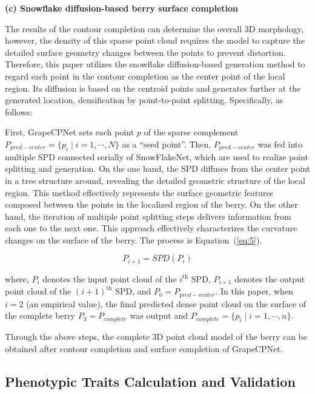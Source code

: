 \documentclass[12pt]{article}
\begin{document}
{\raggedright\textbf{(c) Snowflake diffusion-based berry surface completion}}

The results of the contour completion can determine the overall 3D morphology, however, the density of this sparse point cloud requires the model to capture the detailed surface geometry changes between the points to prevent distortion. 
Therefore, this paper utilizes the snowflake diffusion-based generation method to regard each point in the contour completion as the center point of the local region. 
Its diffusion is based on the centroid points and generates further at the generated location, densification by point-to-point splitting. 
Specifically, as follows:

First, GrapeCPNet sets each point $p$ of the sparse complement $P_{pred-center}=\{p_i \mid i=1,\cdots,N\}$ as a ``seed point''. 
Then, $P_{pred-center}$ was fed into multiple SPD \citep{xiang_snowflakenet_2021} connected serially of SnowFlakeNet, which are used to realize point splitting and generation. 
On the one hand, the SPD diffuses from the center point in a tree structure around, revealing the detailed geometric structure of the local region. 
This method effectively represents the surface geometric features composed between the points in the localized region of the berry. 
On the other hand, the iteration of multiple point splitting steps delivers information from each one to the next one. 
This approach effectively characterizes the curvature changes on the surface of the berry. The process is Equation~(\ref{eq:5}).

\begin{equation}
    P_{i+1} = SPD(P_i)
    \label{eq:5}
\end{equation}

{\raggedright where, $P_i$ denotes the input point cloud of the $i^{\text{th}}$ SPD, $P_{i+1}$ denotes the output point cloud of the $(i+1)^{\text{th}}$ SPD, and $P_0=P_{pred-center}$. 
In this paper, when $i=2$ (an empirical value), the final predicted dense point cloud on the surface of the complete berry $P_3=P_{complete}$ was output and $P_{complete}=\{p_i \mid i=1,\cdots,n\}$.}

Through the above steps, the complete 3D point cloud model of the berry can be obtained after contour completion and surface completion of GrapeCPNet.

\subsection{Phenotypic Traits Calculation and Validation}
\end{document}
